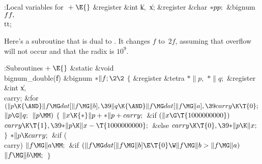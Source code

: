 \B{}:Local variables for \X${}\mathrel+\E{}$\6
\&{register} \&{int} \|k${},{}$ \|x;\6
\&{register} \&{char} ${}{*}\\{pp};{}$\6
\&{bignum} ${}\\{ff\kern-.05em},{}$ \\{tt};\par
\fi

Here's a subroutine that is dual to . It
changes $f$
to~$2f$, assuming that overflow will not occur and that the radix is $10^9$.

\Y\B\4:Subroutines\X${}\mathrel+\E{}$\6
\&{static} \&{void} \\{bignum\_double}(\|f)\1\1\6
\&{bignum} ${}{*}\|f;\2\2{}$\6
${}\{{}$\1\6
\&{register} \&{tetra} ${}{*}\|p,{}$ ${}{*}\|q;{}$\6
\&{register} \&{int} \|x${},{}$ \\{carry};\7
\&{for} ${}(\|p\K{\AND}\|f\MG\\{dat}[\|f\MG\|b],\39\|q\K{\AND}\|f\MG\\{dat}[\|f%
\MG\|a],\39\\{carry}\K\T{0};{}$ ${}\|p\G\|q;{}$ ${}\|p\MM){}$\5
${}\{{}$\1\6
${}\|x\K{*}\|p+{*}\|p+\\{carry};{}$\6
\&{if} ${}(\|x\G\T{1000000000}){}$\1\5
${}\\{carry}\K\T{1},\39{*}\|p\K\|x-\T{1000000000};{}$\2\6
\&{else}\1\5
${}\\{carry}\K\T{0},\39{*}\|p\K\|x;{}$\2\6
\4${}\}{}$\2\6
${}{*}\|p\K\\{carry};{}$\6
\&{if} (\\{carry})\1\5
${}\|f\MG\|a\MM;{}$\2\6
\&{if} ${}(\|f\MG\\{dat}[\|f\MG\|b]\E\T{0}\W\|f\MG\|b>\|f\MG\|a){}$\1\5
${}\|f\MG\|b\MM;{}$\2\6
\4${}\}{}$\2\par
\fi

